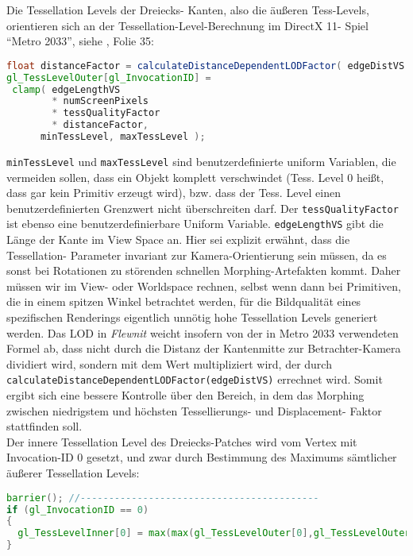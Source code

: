 	Die Tessellation Levels der Dreiecks- Kanten, also die äußeren Tess-Levels, 
	orientieren sich an der Tessellation-Level-Berechnung im 
	DirectX 11- Spiel "`Metro 2033"', siehe \cite{tessMetro2033}, Folie 35:
	\begin{lstlisting}[language=GLSL]
float distanceFactor = calculateDistanceDependentLODFactor( edgeDistVS ) 
gl_TessLevelOuter[gl_InvocationID] =  
 clamp(	edgeLengthVS 
      	* numScreenPixels 
      	* tessQualityFactor 
      	* distanceFactor,
      minTessLevel, maxTessLevel );   
	\end{lstlisting}
	\lstinline|minTessLevel| und \lstinline|maxTessLevel| sind benutzerdefinierte uniform Variablen,
	die vermeiden sollen, dass ein Objekt komplett verschwindet 
	(Tess. Level 0 heißt, dass gar kein Primitiv erzeugt wird), bzw. dass der Tess. Level einen benutzerdefinierten 	
	Grenzwert nicht überschreiten darf.
	Der \lstinline|tessQualityFactor| ist ebenso eine benutzerdefinierbare Uniform Variable. 
	\lstinline|edgeLengthVS| gibt die Länge der Kante im View Space an. Hier sei explizit erwähnt, dass die Tessellation-
	Parameter invariant zur Kamera-Orientierung sein müssen, da es sonst bei Rotationen zu störenden schnellen 
	Morphing-Artefakten kommt. Daher müssen wir im View- oder Worldspace rechnen, selbst wenn dann bei Primitiven,
	die in einem spitzen Winkel betrachtet werden, für die Bildqualität eines spezifischen Renderings eigentlich
	unnötig hohe Tessellation Levels generiert werden.
	Das LOD in \emph{Flewnit} weicht insofern von der in Metro 2033 verwendeten Formel ab, dass nicht durch
	die Distanz der Kantenmitte zur Betrachter-Kamera dividiert wird, sondern mit dem Wert multipliziert wird,
	der durch \lstinline|calculateDistanceDependentLODFactor(edgeDistVS)| errechnet wird.
	Somit ergibt sich eine bessere Kontrolle über den Bereich, in dem das Morphing zwischen niedrigstem
	und höchsten Tessellierungs- und Displacement- Faktor stattfinden soll.\\
	
	Der innere Tessellation Level des Dreiecks-Patches wird vom Vertex mit Invocation-ID 0 gesetzt,
	und zwar durch Bestimmung des Maximums sämtlicher äußerer Tessellation Levels:
	\begin{lstlisting}[language=GLSL]
barrier(); //------------------------------------------ 
if (gl_InvocationID == 0) 
{
  gl_TessLevelInner[0] = max(max(gl_TessLevelOuter[0],gl_TessLevelOuter[1]),gl_TessLevelOuter[2]) ;
}	
	\end{lstlisting}
	
